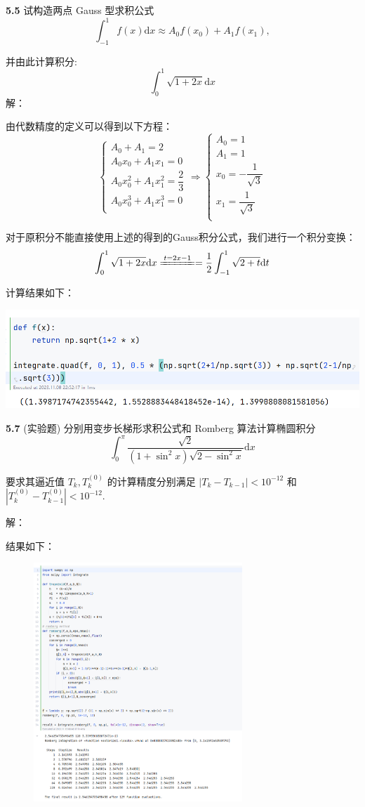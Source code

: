 \documentclass[a4paper,11pt,UTF8]{article}
\begin{document}
\textbf{5.5} 试构造两点 Gauss 型求积公式
$$
	\int_{-1}^1f(x)\mathrm{d}x\approx A_0f(x_0)+A_1f(x_1),
$$

并由此计算积分:
$$
	\int_0^1\sqrt{1+2x}\mathrm{d}x
$$
\noindent 解：

由代数精度的定义可以得到以下方程：
$$
\begin{cases}
	A_0+A_1=2\\
	A_0x_0+A_1x_1=0\\
	A_0x_0^2+A_1x_1^2=\dfrac{2}{3}\\
	A_0x_0^3+A_1x_1^3=0\\
\end{cases}\Rightarrow
\begin{cases}
	A_0=1\\
	A_1=1\\
	x_0=-\dfrac{1}{\sqrt{3}}\\
	x_1=\dfrac{1}{\sqrt{3}}\\
\end{cases}
$$

对于原积分不能直接使用上述的得到的Gauss积分公式，我们进行一个积分变换：
$$
	\int_0^1\sqrt{1+2x}\mathrm{d}x\xlongequal{t=2x-1}=\frac12\int_{-1}^1\sqrt{2+t}\mathrm{d}t
$$

计算结果如下：

\includegraphics[width=1\textwidth]{5.5_1}

\textbf{5.7} (实验题) 分别用变步长梯形求积公式和 Romberg 算法计算椭圆积分
$$
	\int_0^\pi\frac{\sqrt{2}}{(1+\sin^2x)\sqrt{2-\sin^2x}}\mathrm{d}x
$$

要求其逼近值 $T_k,T_k^{(0)}$ 的计算精度分别满足 $|T_k-T_{k-1}|<10^{-12}$ 和$|T_k^{(0)}-T_{k-1}^{(0)}|<10^{-12}$.

\noindent 解：

结果如下：
\begin{figure}[H]
	\centering
	\includegraphics[width=0.7\textwidth]{5.7}
\end{figure}
\end{document}
